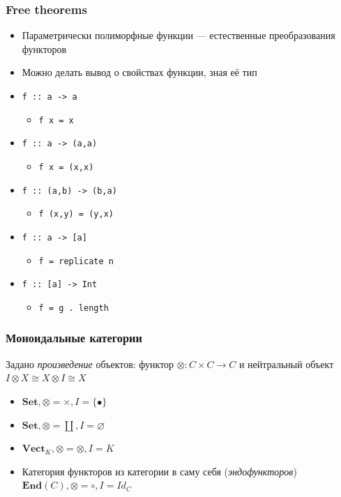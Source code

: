 \documentclass{beamer}
\begin{document}
\begin{frame}
\frametitle{Free theorems}
\begin{itemize}
\item Параметрически полиморфные функции --- естественные преобразования функторов
\item Можно делать вывод о свойствах функции, зная её тип
\end{itemize}
\pause
\begin{itemize}
\item \texttt{f :: a -> a}
\begin{itemize}
\item \texttt{f x = x}
\end{itemize}
\pause
\item \texttt{f :: a -> (a,a)}
\begin{itemize}
\item \texttt{f x = (x,x)}
\end{itemize}
\pause
\item \texttt{f :: (a,b) -> (b,a)}
\begin{itemize}
\item \texttt{f (x,y) = (y,x)}
\end{itemize}
\pause
\item \texttt{f :: a -> [a]}
\begin{itemize}
\item \texttt{f = replicate n}
\end{itemize}
\pause
\item \texttt{f :: [a] -> Int}
\begin{itemize}
\item \texttt{f = g . length}
\end{itemize}
\end{itemize}
\end{frame}

\begin{frame}
\frametitle{Моноидальные категории}
Задано \textit{произведение} объектов: функтор \begin{math}\otimes:C\times C\rightarrow C\end{math} и нейтральный объект \begin{math}I\otimes X \cong X \otimes I \cong X\end{math}
\begin{itemize}
\item \begin{math}\mathbf{Set}, \otimes = \times, I = \{\bullet\}\end{math}
\item \begin{math}\mathbf{Set}, \otimes = \coprod, I = \varnothing\end{math}
\item \begin{math}\mathbf{Vect}_K, \otimes = \otimes, I = K\end{math}
\item Категория функторов из категории в саму себя (\textit{эндофункторов}) \begin{math}\mathbf{End}(C), \otimes = \circ, I = Id_C\end{math}
\end{itemize}
\end{frame}
\end{document}
